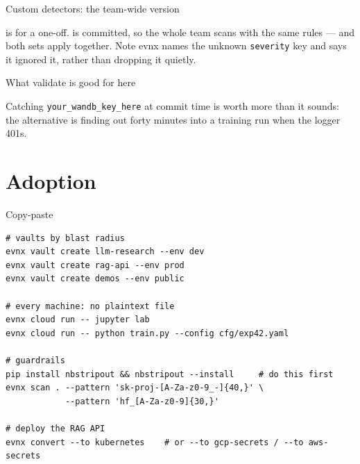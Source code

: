 \documentclass[aspectratio=169,10pt]{beamer}
\begin{document}
\begin{frame}[fragile]{Custom detectors: the team-wide version}

  \vspace{0.3em}
  {\footnotesize {} is for a one-off.  is
  committed, so the whole team scans with the same rules --- and both sets
  apply together. Note evnx names the unknown \texttt{severity} key and says it
  ignored it, rather than dropping it quietly.}
\end{frame}

\begin{frame}[fragile]{What validate is good for here}

  \vspace{0.4em}
  {\footnotesize Catching \texttt{your\_wandb\_key\_here} at commit time is
  worth more than it sounds: the alternative is finding out forty minutes into
  a training run when the logger 401s.}
\end{frame}

\section{Adoption}

\begin{frame}[fragile]{Copy-paste}
\begin{lstlisting}[style=evnxcode]
# vaults by blast radius
evnx vault create llm-research --env dev
evnx vault create rag-api --env prod
evnx vault create demos --env public

# every machine: no plaintext file
evnx cloud run -- jupyter lab
evnx cloud run -- python train.py --config cfg/exp42.yaml

# guardrails
pip install nbstripout && nbstripout --install     # do this first
evnx scan . --pattern 'sk-proj-[A-Za-z0-9_-]{40,}' \
            --pattern 'hf_[A-Za-z0-9]{30,}'

# deploy the RAG API
evnx convert --to kubernetes    # or --to gcp-secrets / --to aws-secrets
\end{lstlisting}
\end{frame}
\end{document}
